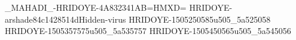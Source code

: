 _MAHADI_-HRIDOYE-4A832341AB=HMXD=
HRIDOYE-arshade84c1428514dHidden-virus
HRIDOYE-1505250585u505_5a525058
HRIDOYE-1505357575u505_5a535757
HRIDOYE-1505450565u505_5a545056
